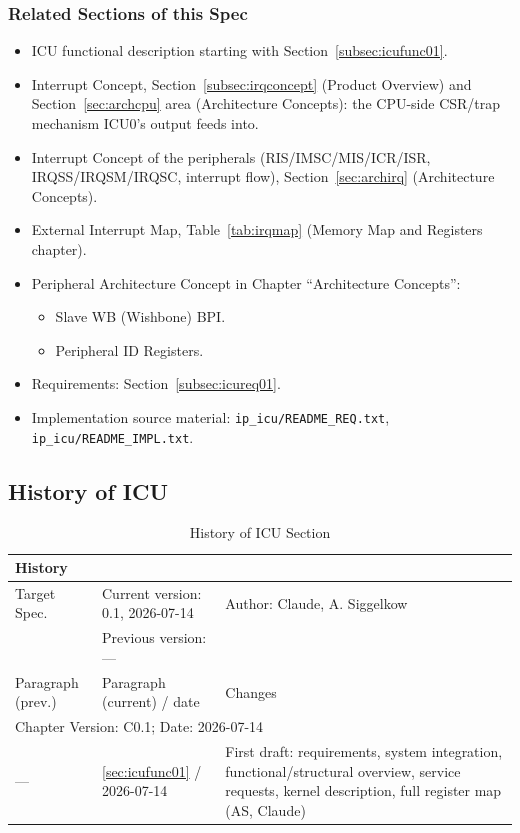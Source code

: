 \subsubsection{Related Sections of this Spec}
\begin{itemize}
  \item ICU functional description starting with Section~\ref{subsec:icufunc01}.
  \item Interrupt Concept, Section~\ref{subsec:irqconcept} (Product Overview)
    and Section~\ref{sec:archcpu} area (Architecture Concepts): the CPU-side
    CSR/trap mechanism ICU0's output feeds into.
  \item Interrupt Concept of the peripherals (RIS/IMSC/MIS/ICR/ISR, IRQSS/IRQSM/IRQSC,
    interrupt flow), Section~\ref{sec:archirq} (Architecture Concepts).
  \item External Interrupt Map, Table~\ref{tab:irqmap} (Memory Map and
    Registers chapter).
  \item Peripheral Architecture Concept in Chapter ``Architecture Concepts'':
  \begin{itemize}
    \item Slave WB (Wishbone) BPI.
    \item Peripheral ID Registers.
  \end{itemize}
  \item Requirements: Section~\ref{subsec:icureq01}.
  \item Implementation source material: \texttt{ip\_icu/README\_REQ.txt},
    \texttt{ip\_icu/README\_IMPL.txt}.
\end{itemize}

\subsection{History of ICU}

\begin{table}[H]
\caption{History of ICU Section}
\label{tab:icuhistory02}
\centering
\begin{tabularx}{\textwidth}{|X |X |X|}
  \hline
  \multicolumn{3}{|l|}{History} \\
  \hline
  \multicolumn{1}{|l}{Target Spec.} &
  \multicolumn{1}{l}{Current version: 0.1, 2026-07-14} &
  \multicolumn{1}{l|}{Author: Claude, A. Siggelkow} \\
  \multicolumn{1}{|l}{ } &
  \multicolumn{1}{l}{Previous version: --- } &
  \multicolumn{1}{l|}{ } \\
  \hline
  \hline
  Paragraph (prev.) & Paragraph (current) / date & Changes \\
  \hline
  \hline
  \multicolumn{3}{|l|}{Chapter Version: C0.1; Date: 2026-07-14} \\
  \hline
  --- & \ref{sec:icufunc01} / 2026-07-14 & First draft: requirements,
    system integration, functional/structural overview, service requests,
    kernel description, full register map (AS, Claude) \\
  \hline
\end{tabularx}
\end{table}

